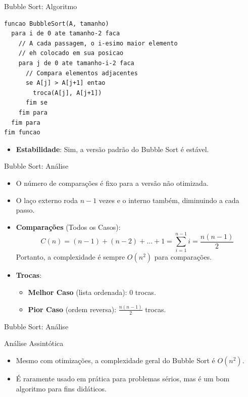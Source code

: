 \documentclass{beamer}
\begin{document}
\begin{frame}[fragile]{Bubble Sort: Algoritmo}
\begin{lstlisting}
funcao BubbleSort(A, tamanho)
  para i de 0 ate tamanho-2 faca
    // A cada passagem, o i-esimo maior elemento
    // eh colocado em sua posicao
    para j de 0 ate tamanho-i-2 faca
      // Compara elementos adjacentes
      se A[j] > A[j+1] entao
        troca(A[j], A[j+1])
      fim se
    fim para
  fim para
fim funcao
\end{lstlisting}
\begin{itemize}
    \item \textbf{Estabilidade}: Sim, a versão padrão do Bubble Sort é estável.

\end{itemize}
\end{frame}

\begin{frame}{Bubble Sort: Análise}
\begin{itemize}
    \item O número de comparações é fixo para a versão não otimizada.
    \item O laço externo roda $n-1$ vezes e o interno também, diminuindo a cada passo.
    \item \textbf{Comparações} (Todos os Casos):
    $$C(n) = (n-1) + (n-2) + \dots + 1 = \sum_{i=1}^{n-1} i = \frac{n(n-1)}{2}$$
    Portanto, a complexidade é sempre $O(n^2)$ para comparações.
    \item \textbf{Trocas}:
    \begin{itemize}
        \item \textbf{Melhor Caso} (lista ordenada): 0 trocas.
        \item \textbf{Pior Caso} (ordem reversa): $\frac{n(n-1)}{2}$ trocas.
    \end{itemize}
\end{itemize}

\end{frame}

\begin{frame}{Bubble Sort: Análise}
\begin{block}{Análise Assintótica}
\begin{itemize}
    \item Mesmo com otimizações, a complexidade geral do Bubble Sort é $O(n^2)$.
    \item É raramente usado em prática para problemas sérios, mas é um bom algoritmo para fins didáticos.
\end{itemize}
\end{block}
\end{frame}
\end{document}
